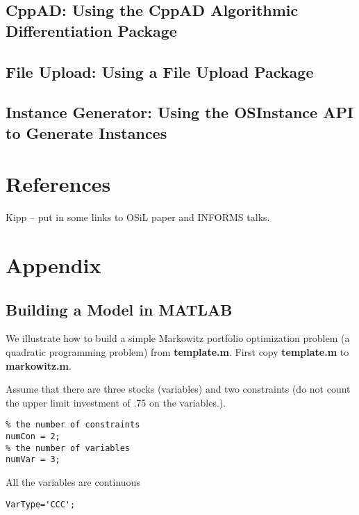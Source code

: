 \documentclass[11pt]{article}
\renewcommand{\_}{{\char"5F}}
\renewcommand{\{}{{\char"7B}}
\renewcommand{\}}{{\char"7D}}
\renewcommand{\^}{{\char"0D}}
\renewcommand{\'}{{\char"0D}}
\begin{document}
\subsection{CppAD:  Using the CppAD Algorithmic Differentiation Package}\label{section:cppad}

\subsection{File Upload:  Using a File Upload Package}\label{section:fileupload}

\subsection{Instance Generator: Using the OSInstance API to Generate Instances}\label{subsection:exampleOSInstance}

\section{References}

Kipp -- put in some links to OSiL paper and INFORMS talks.

\section{Appendix}\label{section:appendix}


\subsection{Building a Model in MATLAB}

We illustrate how to build a simple Markowitz portfolio optimization problem (a quadratic programming problem) from {\bf template.m}. First copy {\bf template.m} to {\bf markowitz.m}. 

Assume that there are three stocks (variables) and two constraints (do not count the upper limit investment of .75 on the variables.).


\begin{verbatim}
% the number of constraints
numCon = 2;
% the number of variables
numVar = 3;
\end{verbatim}



All the variables are continuous


\begin{verbatim}
VarType='CCC';
\end{verbatim}
\end{document}
